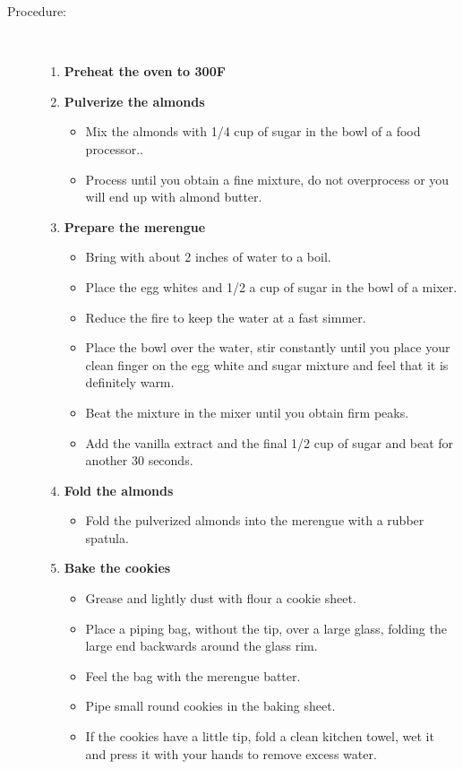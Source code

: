 \documentclass[11pt,letterpaper]{article}
\begin{document}
\begin{description}
\item[Procedure:]\ \\
	\begin{enumerate}
	\item {\bf Preheat the oven to 300F}
	\item {\bf Pulverize the almonds}
	\begin{itemize}
	\item Mix the almonds with 1/4 cup of sugar in the bowl of a food processor..
        \item Process until you obtain a fine mixture, do not overprocess or you will end up with almond butter.
	\end{itemize}
	\item {\bf Prepare the merengue}
	\begin{itemize}
	\item Bring with about 2 inches of water to a boil.
	\item Place the egg whites and 1/2 a cup of sugar in the bowl of a mixer.
	\item Reduce the fire to keep the water at a fast simmer.
	\item Place the bowl over the water, stir constantly until you place your clean finger on the egg white and sugar mixture and feel that it is definitely warm.
	\item Beat the mixture in the mixer until you obtain firm peaks.
	\item Add the vanilla extract and the final 1/2 cup of sugar and beat for another 30 seconds.
	\end{itemize}
	\item {\bf Fold the almonds}
	\begin{itemize}
	\item Fold the pulverized almonds into the merengue with a rubber spatula.
	\end{itemize}
	\item {\bf Bake the cookies}
	\begin{itemize}
	\item Grease and lightly dust with flour a cookie sheet.
	\item Place a piping bag, without the tip, over a large glass, folding the large end backwards around the glass rim.
	\item Feel the bag with the merengue batter.
	\item Pipe small round cookies in the baking sheet.
	\item If the cookies have a little tip, fold a clean kitchen towel, wet it and press it with your hands to remove excess water.

\end{itemize}
\end{enumerate}
\end{description}
\end{document}
